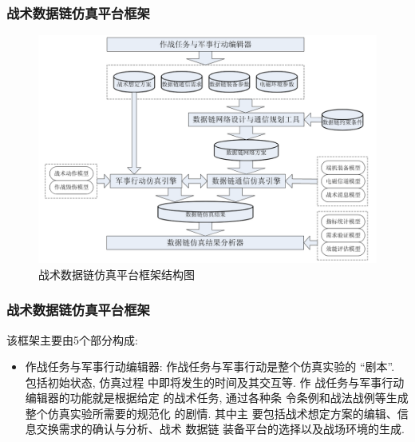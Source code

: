 \documentclass[10pt,mathserif]{beamer}%
\begin{document}
\begin{frame}[fragile]
	\frametitle{战术数据链仿真平台框架}
	\setlength{\parindent}{2em}
	\begin{spacing}{1.5}
		\begin{figure}[htb]
			\centering
			\includegraphics[width=1\linewidth]{./images/arch.png}
			\caption{战术数据链仿真平台框架结构图}
			\label{Fig:arch}
		\end{figure}
	\end{spacing}
\end{frame}

\begin{frame}[fragile]
	\frametitle{战术数据链仿真平台框架}
	该框架主要由5个部分构成:
	\begin{spacing}{1.5}
		\begin{itemize}
			\item 作战任务与军事行动编辑器: 作战任务与军事行动是整个仿真实验的
				``剧本''. 包括初始状态, 仿真过程 中即将发生的时间及其交互等. 作
				战任务与军事行动编辑器的功能就是根据给定 的战术任务, 通过各种条
				令条例和战法战例等生成整个仿真实验所需要的规范化 的剧情. 其中主
				要包括战术想定方案的编辑、信息交换需求的确认与分析、战术 数据链
				装备平台的选择以及战场环境的生成. 
		\end{itemize}
	\end{spacing}
\end{frame}
\end{document}
